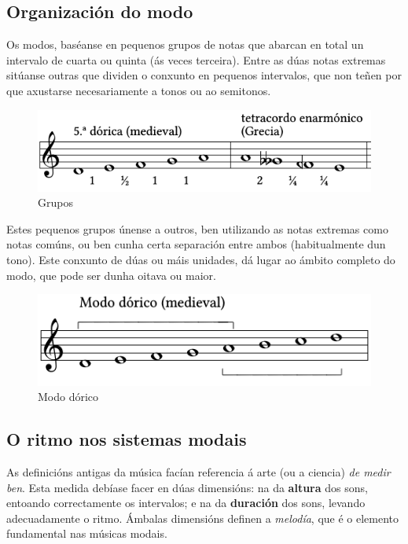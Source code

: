 \documentclass[a4paper, twoside]{templates/ociamthesis}
\begin{document}
\hypertarget{organizaciuxf3n-do-modo}{%
\subsection{Organización do modo}\label{organizaciuxf3n-do-modo}}

Os modos, baséanse en pequenos grupos de notas que abarcan en total un intervalo de cuarta ou quinta (ás veces terceira). Entre as dúas notas extremas sitúanse outras que dividen o conxunto en pequenos intervalos, que non teñen por que axustarse necesariamente a tonos ou ao semitonos.

\begin{figure}
\centering
\includegraphics{figures/ud-03/grupos.png}
\caption{Grupos}
\end{figure}

Estes pequenos grupos únense a outros, ben utilizando as notas extremas como notas comúns, ou ben cunha certa separación entre ambos (habitualmente dun tono). Este conxunto de dúas ou máis unidades, dá lugar ao ámbito completo do modo, que pode ser dunha oitava ou maior.

\begin{figure}
\centering
\includegraphics{figures/ud-03/escalas-2.png}
\caption{Modo dórico}
\end{figure}

\hypertarget{o-ritmo-nos-sistemas-modais}{%
\subsection{O ritmo nos sistemas modais}\label{o-ritmo-nos-sistemas-modais}}

As definicións antigas da música facían referencia á arte (ou a ciencia) \emph{de medir ben}. Esta medida debíase facer en dúas dimensións: na da \textbf{altura} dos sons, entoando correctamente os intervalos; e na da \textbf{duración} dos sons, levando adecuadamente o ritmo. Ámbalas dimensións definen a \emph{melodía}, que é o elemento fundamental nas músicas modais.
\end{document}
